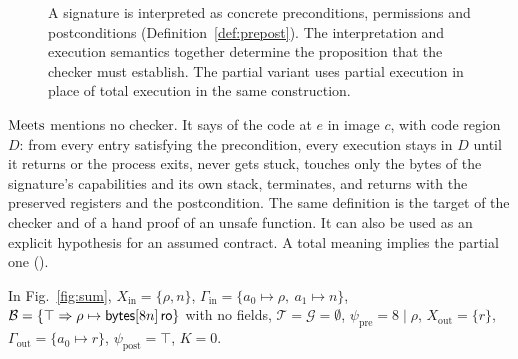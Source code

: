 \begin{figure}[t]
\centering
{}
\caption{A signature is interpreted as concrete preconditions, permissions and postconditions (Definition~\ref{def:prepost}). The interpretation and execution semantics together determine the proposition that the checker must establish. The partial variant uses partial execution in place of total execution in the same construction.}
\end{figure}


$\mathrm{Meets}$ mentions no checker. It says of the code at $e$ in image $c$, with code region $D$: from every entry satisfying the precondition, every execution stays in $D$ until it returns or the process exits, never gets stuck, touches only the bytes of the signature's capabilities and its own stack, terminates, and returns with the preserved registers and the postcondition. The same definition is the target of the checker and of a hand proof of an unsafe function. It can also be used as an explicit hypothesis for an assumed contract. A total meaning implies the partial one ().

\begin{example}\label{ex:sig}
In Fig.~\ref{fig:sum}, $X_{\mathrm{in}}=\{\rho,n\}$, $\Gamma_{\mathrm{in}}=\{a_0\mapsto\rho,\ a_1\mapsto n\}$, $\mathcal{B}=\{\top\Rightarrow\rho\mapsto\mathsf{bytes}[8n]\,\mathsf{ro}\}$ with no fields, $\mathcal{T}=\mathcal{G}=\emptyset$, $\psi_{\mathrm{pre}}=8\mid\rho$, $X_{\mathrm{out}}=\{r\}$, $\Gamma_{\mathrm{out}}=\{a_0\mapsto r\}$, $\psi_{\mathrm{post}}=\top$, $K=0$.
\end{example}

